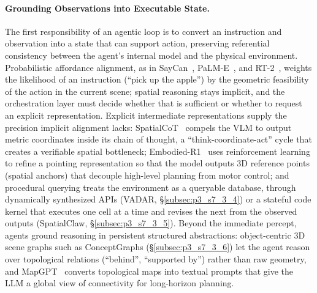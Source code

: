 \paragraph{Grounding Observations into Executable State.}
The first responsibility of an agentic loop is to convert an instruction and observation into a state that can support action, preserving referential consistency between the agent's internal model and the physical environment.
Probabilistic affordance alignment, as in SayCan~\cite{ahn2022icanisay}, PaLM-E~\cite{driess2023palm}, and RT-2~\cite{zitkovich2023rt2}, weights the likelihood of an instruction (``pick up the apple'') by the geometric feasibility of the action in the current scene; spatial reasoning stays implicit, and the orchestration layer must decide whether that is sufficient or whether to request an explicit representation.
Explicit intermediate representations supply the precision implicit alignment lacks: SpatialCoT~\cite{liu2025spatialcot} compels the VLM to output metric coordinates inside its chain of thought, a ``think-coordinate-act'' cycle that creates a verifiable spatial bottleneck; Embodied-R1~\cite{yuan2025embodiedr1} uses reinforcement learning to refine a pointing representation so that the model outputs 3D reference points (spatial anchors) that decouple high-level planning from motor control; and procedural querying treats the environment as a queryable database, through dynamically synthesized APIs (VADAR, §\ref{subsec:p3_s7_3_4}) or a stateful code kernel that executes one cell at a time and revises the next from the observed outputs (SpatialClaw, §\ref{subsec:p3_s7_3_5}).
Beyond the immediate percept, agents ground reasoning in persistent structured abstractions: object-centric 3D scene graphs such as ConceptGraphs (§\ref{subsec:p3_s7_3_6}) let the agent reason over topological relations (``behind'', ``supported by'') rather than raw geometry, and MapGPT~\cite{chen2024mapgpt} converts topological maps into textual prompts that give the LLM a global view of connectivity for long-horizon planning.

